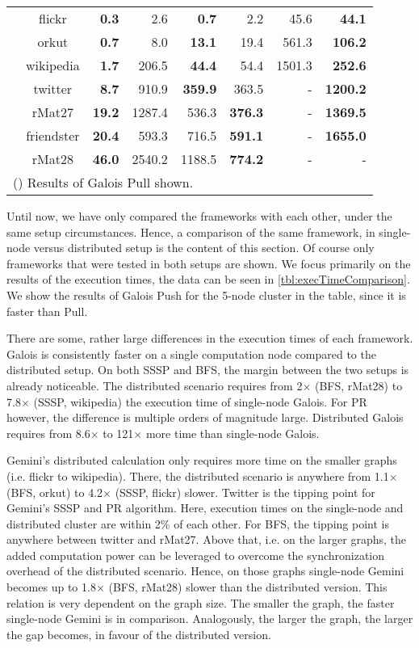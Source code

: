 \begin{table}
\begin{tabular}{ccr@{\tabskip 1 \tabcolsep}r
	r@{\tabskip 1 \tabcolsep}r
	r@{\tabskip 1 \tabcolsep}r}
		\midrule
		\multirow{7}{0.5ex}{\rotatebox{90}{\bf PR}}& flickr & \bf 0.3\txtdagger & 2.6 & \bf 0.7 & 2.2 & 45.6 & \bf 44.1 \\
		& orkut & \bf 0.7\txtdagger & 8.0 & \bf 13.1 & 19.4 & 561.3 & \bf 106.2 \\
		& wikipedia & \bf 1.7\txtdagger & 206.5 & \bf 44.4 & 54.4 & 1501.3 & \bf 252.6 \\
		& twitter & \bf 8.7\txtdagger & 910.9 & \bf 359.9 & 363.5 & - & \bf 1200.2 \\
		& rMat27 & \bf 19.2\txtdagger & 1287.4 & 536.3 & \bf 376.3 & - & \bf 1369.5 \\
		& friendster & \bf 20.4\txtdagger & 593.3 & 716.5 & \bf 591.1 & - & \bf 1655.0 \\
		& rMat28 & \bf 46.0\txtdagger & 2540.2 & 1188.5 & \bf 774.2 & - & - \\
		\bottomrule
		\multicolumn{8}{l}{(\txtdagger) Results of Galois Pull shown.}
	\end{tabular}
\end{table}
Until now, we have only compared the frameworks with each other, under the same setup circumstances. Hence, a comparison of the same framework, in single-node versus distributed setup is the content of this section.
Of course only frameworks that were tested in both setups are shown.
We focus primarily on the results of the execution times, the data can be seen in \autoref{tbl:execTimeComparison}. We show the results of Galois Push for the 5-node cluster in the table, since it is faster than Pull.

There are some, rather large differences in the execution times of each framework. Galois is consistently faster on a single computation node compared to the distributed setup. 
On both SSSP and BFS, the margin between the two setups is already noticeable. The distributed scenario requires from 2$\times$ (BFS, rMat28) to 7.8$\times$ (SSSP, wikipedia) the execution time of single-node Galois.
For PR however, the difference is multiple orders of magnitude large. Distributed Galois requires from 8.6$\times$ to 121$\times$ more time than single-node Galois. 

Gemini's distributed calculation only requires more time on the smaller graphs (i.e. flickr to wikipedia). There, the distributed scenario is anywhere from 1.1$\times$ (BFS, orkut) to 4.2$\times$ (SSSP, flickr) slower.
Twitter is the tipping point for Gemini's SSSP and PR algorithm. Here, execution times on the single-node and distributed cluster are within 2\% of each other. For BFS, the tipping point is anywhere between twitter and rMat27.
Above that, i.e. on the larger graphs, the added computation power can be leveraged to overcome the synchronization overhead of the distributed scenario. Hence, on those graphs single-node Gemini becomes up to 1.8$\times$ (BFS, rMat28) slower than the distributed version.
This relation is very dependent on the graph size. The smaller the graph, the faster single-node Gemini is in comparison. Analogously, the larger the graph, the larger the gap becomes, in favour of the distributed version.


